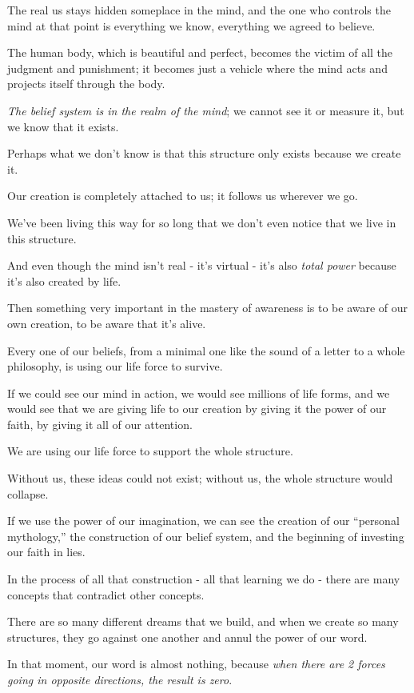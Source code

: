\documentclass{article}
\numberwithin{equation}{section}
\begin{document}
The real us stays hidden someplace in the mind, and the one who controls the mind at that point is everything we know, everything we agreed to believe.

The human body, which is beautiful and perfect, becomes the victim of all the judgment and punishment; it becomes just a vehicle where the mind acts and projects itself through the body.

%
\textit{The belief system is in the realm of the mind}; we cannot see it or measure it, but we know that it exists.

Perhaps what we don't know is that this structure only exists because we create it.

Our creation is completely attached to us; it follows us wherever we go.

We've been living this way for so long that we don't even notice that we live in this structure.

And even though the mind isn't real - it's virtual - it's also \textit{total power} because it's also created by life.

%
Then something very important in the mastery of awareness is to be aware of our own creation, to be aware that it's alive.

Every one of our beliefs, from a minimal one like the sound of a letter to a whole philosophy, is using our life force to survive.

If we could see our mind in action, we would see millions of life forms, and we would see that we are giving life to our creation by giving it the power of our faith, by giving it all of our attention.

We are using our life force to support the whole structure.

Without us, these ideas could not exist; without us, the whole structure would collapse.

%
If we use the power of our imagination, we can see the creation of our ``personal mythology,'' the construction of our belief system, and the beginning of investing our faith in lies.

In the process of all that construction - all that learning we do - there are many concepts that contradict other concepts.

There are so many different dreams that we build, and when we create so many structures, they go against one another and annul the power of our word.

In that moment, our word is almost nothing, because \textit{when there are 2 forces going in opposite directions, the result is zero}.
\end{document}
